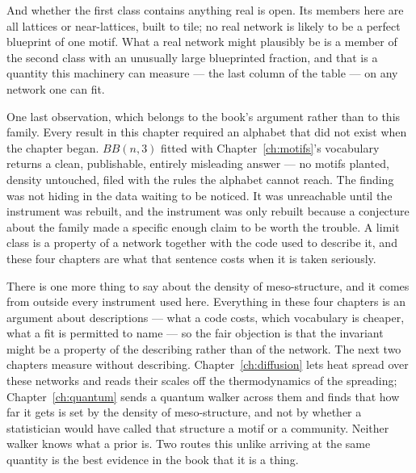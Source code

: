 And whether the first class contains anything real is open. Its members here are
all lattices or near-lattices, built to tile; no real network is likely to be a
perfect blueprint of one motif. What a real network might plausibly be is a
member of the second class with an unusually large blueprinted fraction, and that
is a quantity this machinery can measure --- the last column of the table --- on
any network one can fit.

One last observation, which belongs to the book's argument rather than to this
family. Every result in this chapter required an alphabet that did not exist when
the chapter began. $BB(n,3)$ fitted with Chapter~\ref{ch:motifs}'s vocabulary
returns a clean, publishable, entirely misleading answer --- no motifs planted,
density untouched, filed with the rules the alphabet cannot reach. The finding
was not hiding in the data waiting to be noticed. It was unreachable until the
instrument was rebuilt, and the instrument was only rebuilt because a conjecture
about the family made a specific enough claim to be worth the trouble. A limit
class is a property of a network together with the code used to describe it, and
these four chapters are what that sentence costs when it is taken seriously.

There is one more thing to say about the density of meso-structure, and it comes from
outside every instrument used here. Everything in these four chapters is an argument
about descriptions --- what a code costs, which vocabulary is cheaper, what a fit is
permitted to name --- so the fair objection is that the invariant might be a property
of the describing rather than of the network. The next two chapters measure without
describing. Chapter~\ref{ch:diffusion} lets heat spread over these networks and reads
their scales off the thermodynamics of the spreading; Chapter~\ref{ch:quantum} sends a
quantum walker across them and finds that how far it gets is set by the density of
meso-structure, and not by whether a statistician would have called that structure a
motif or a community. Neither walker knows what a prior is. Two routes this unlike
arriving at the same quantity is the best evidence in the book that it is a thing.
